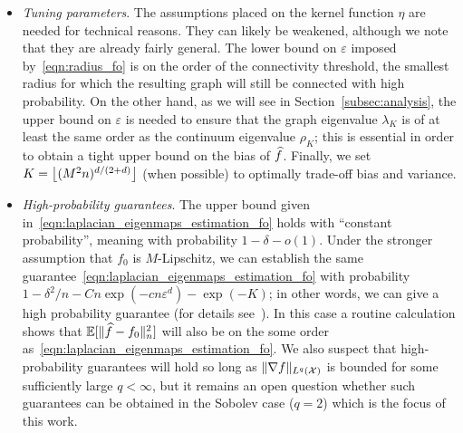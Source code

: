 \begin{itemize}
	\item \emph{Tuning parameters}. The assumptions placed on the kernel function $\eta$ are needed for technical reasons. They can likely be weakened, although we note that they are already fairly general. The lower bound on $\varepsilon$ imposed by~\eqref{eqn:radius_fo} is on the order of the connectivity threshold, the smallest radius for which the resulting graph will still be connected with high probability. On the other hand, as we will see in Section~\ref{subsec:analysis}, the upper bound on $\varepsilon$ is needed to ensure that the graph eigenvalue $\lambda_K$ is of at least the same order as the continuum eigenvalue $\rho_K$; this is essential in order to obtain a tight upper bound on the bias of $\widehat{f}$.  Finally, we set $K = \left\lfloor (M^2n)^{d/(2 + d)} \right\rfloor$ (when possible) to optimally trade-off bias and variance.
	
	
	
	\item \emph{High-probability guarantees}. The upper bound given in~\eqref{eqn:laplacian_eigenmaps_estimation_fo} holds with ``constant probability'', meaning with probability $1 - \delta - o(1)$. Under the stronger assumption that $f_0$ is $M$-Lipschitz, we can establish the same guarantee~\eqref{eqn:laplacian_eigenmaps_estimation_fo} with probability $1 - \delta^2/n - Cn\exp(-cn\varepsilon^d) - \exp(-K)$; in other words, we can give a high probability guarantee (for details see~\cite{green2021}). In this case a routine calculation shows that $\mathbb{E}[\|\widehat{f} - f_0\|_n^2]$ will also be on the some order as~\eqref{eqn:laplacian_eigenmaps_estimation_fo}. We also suspect that high-probability guarantees will hold so long as $\|\nabla f\|_{L^q(\mathcal{X})}$ is bounded for some sufficiently large $q < \infty$, but it remains an open question whether such guarantees can be obtained in the Sobolev case ($q = 2$) which is the focus of this work. 
\end{itemize}


